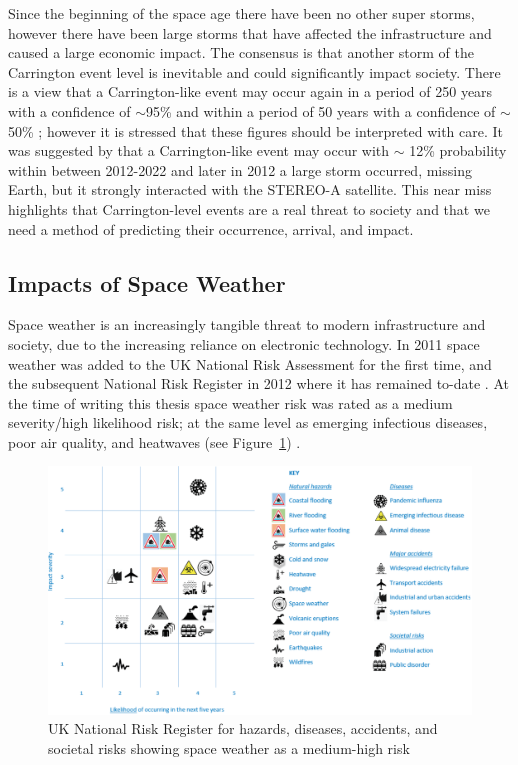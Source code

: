 Since the beginning of the space age there have been no other super storms, however there have been large storms that have affected the infrastructure and caused a large economic impact. The consensus is that another storm of the Carrington event level is inevitable and could significantly impact society. There is a view that a Carrington-like event may occur again in a period of 250 years with a confidence of $\sim$95\% and within a period of 50 years with a confidence of $\sim$50\% \citep{cannon_extreme_2013}; however it is stressed that these figures should be interpreted with care. It was suggested by \cite{riley_probability_2012} that a Carrington-like event may occur with $\sim$ 12\% probability within between 2012-2022 and later in 2012 a large storm occurred, missing Earth, but it strongly interacted with the STEREO-A satellite. This near miss highlights that Carrington-level events are a real threat to society and that we need a method of predicting their occurrence, arrival, and impact.



\subsection{Impacts of Space Weather}
\label{sw_impacts}
Space weather is an increasingly tangible threat to modern infrastructure and society, due to the increasing reliance on electronic technology. In 2011 space weather was added to the UK National Risk Assessment for the first time, and the subsequent National Risk Register in 2012 \citep{bis_space_2015} where it has remained to-date \citep{hm_government_national_2020}. At the time of writing this thesis space weather risk was rated as a medium severity/high likelihood risk; at the same level as emerging infectious diseases, poor air quality, and heatwaves (see Figure~\ref{fig:UK_Risk_reg}) \citep{cabinet_office_national_2017}.

\begin{figure}[ht!]
	\centering
	\includegraphics[width=\columnwidth]{UK_risk_register.eps}
	\caption{UK National Risk Register for hazards, diseases, accidents, and societal risks showing space weather as a medium-high risk \citep{cabinet_office_national_2017}}
	\label{fig:UK_Risk_reg}
\end{figure}

